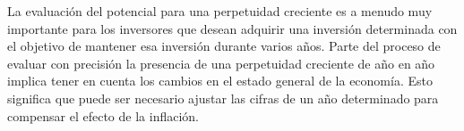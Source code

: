 La evaluaci\'on del potencial para una perpetuidad creciente es a menudo muy importante para los inversores que desean adquirir una inversi\'on determinada con el objetivo de mantener esa inversi\'on durante varios a\~nos. Parte del proceso de evaluar con precisi\'on la presencia de una perpetuidad creciente de a\~no en a\~no implica tener en cuenta los cambios en el estado general de la econom\'ia. Esto significa que puede ser necesario ajustar las cifras de un a\~no determinado para compensar el efecto de la inflaci\'on. \\[10pt]

